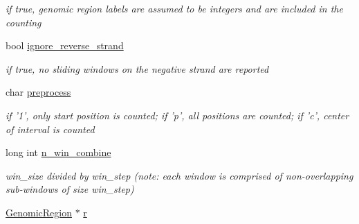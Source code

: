 \begin{CompactItemize}
\begin{CompactList}\small\item\em if true, genomic region labels are assumed to be integers and are included in the counting \item\end{CompactList}\item 
\hypertarget{classGenomicRegionSetScanner_10c1d22ae74e6f295cd17259f70eff8a}{
bool \hyperlink{classGenomicRegionSetScanner_10c1d22ae74e6f295cd17259f70eff8a}{ignore\_\-reverse\_\-strand}}
\label{classGenomicRegionSetScanner_10c1d22ae74e6f295cd17259f70eff8a}

\begin{CompactList}\small\item\em if true, no sliding windows on the negative strand are reported \item\end{CompactList}\item 
\hypertarget{classGenomicRegionSetScanner_f2a536e23023f96c57f51e2276b4be0e}{
char \hyperlink{classGenomicRegionSetScanner_f2a536e23023f96c57f51e2276b4be0e}{preprocess}}
\label{classGenomicRegionSetScanner_f2a536e23023f96c57f51e2276b4be0e}

\begin{CompactList}\small\item\em if '1', only start position is counted; if 'p', all positions are counted; if 'c', center of interval is counted \item\end{CompactList}\item 
\hypertarget{classGenomicRegionSetScanner_bab8a5c92ec438168e22eb6e33098aba}{
long int \hyperlink{classGenomicRegionSetScanner_bab8a5c92ec438168e22eb6e33098aba}{n\_\-win\_\-combine}}
\label{classGenomicRegionSetScanner_bab8a5c92ec438168e22eb6e33098aba}

\begin{CompactList}\small\item\em win\_\-size divided by win\_\-step (note: each window is comprised of non-overlapping sub-windows of size win\_\-step) \item\end{CompactList}\item 
\hypertarget{classGenomicRegionSetScanner_60dff3d69ed195c0492711ee295720c2}{
\hyperlink{classGenomicRegion}{GenomicRegion} $\ast$ \hyperlink{classGenomicRegionSetScanner_60dff3d69ed195c0492711ee295720c2}{r}}
\label{classGenomicRegionSetScanner_60dff3d69ed195c0492711ee295720c2}


\end{CompactItemize}
